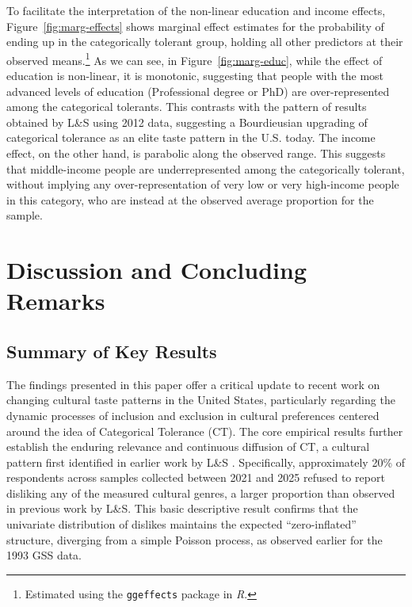 \documentclass[12pt]{article}
\begin{document}
To facilitate the interpretation of the non-linear education and income effects, Figure~\ref{fig:marg-effects} shows marginal effect estimates for the probability of ending up in the categorically tolerant group, holding all other predictors at their observed means.\footnote{Estimated using the \texttt{ggeffects} package in \textit{R}.} As we can see, in Figure~\ref{fig:marg-educ}, while the effect of education is non-linear, it is monotonic, suggesting that people with the most advanced levels of education (Professional degree or PhD) are over-represented among the categorical tolerants. This contrasts with the pattern of results obtained by L\&S using 2012 data, suggesting a Bourdieusian upgrading of categorical tolerance as an elite taste pattern in the U.S. today. The income effect, on the other hand, is parabolic along the observed range. This suggests that middle-income people are underrepresented among the categorically tolerant, without implying any over-representation of very low or very high-income people in this category, who are instead at the observed average proportion for the sample. 

\section*{Discussion and Concluding Remarks}

\subsection*{Summary of Key Results}

The findings presented in this paper offer a critical update to recent work on changing cultural taste patterns in the United States, particularly regarding the dynamic processes of inclusion and exclusion in cultural preferences centered around the idea of Categorical Tolerance (CT). The core empirical results further establish the enduring relevance and continuous diffusion of CT, a cultural pattern first identified in earlier work by L\&S \citeyearpar{lizardo2016end-4fb}. Specifically, approximately 20\% of respondents across samples collected between 2021 and 2025 refused to report disliking any of the measured cultural genres, a larger proportion than observed in previous work by L\&S. This basic descriptive result confirms that the univariate distribution of dislikes maintains the expected ``zero-inflated'' structure, diverging from a simple Poisson process, as observed earlier for the 1993 GSS data.
\end{document}
